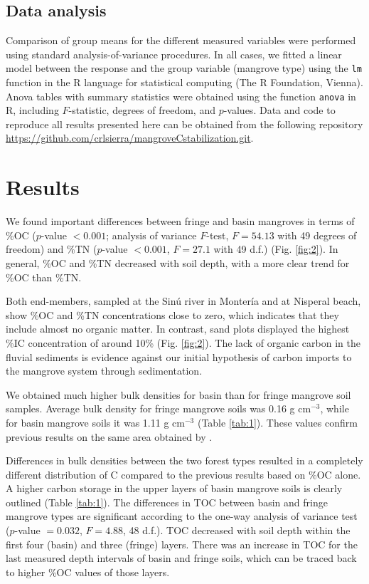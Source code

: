 \subsection{Data analysis}
Comparison of group means for the different measured variables were performed using standard analysis-of-variance procedures. In all cases, we fitted a linear model between the response and the group variable (mangrove type) using the {\tt lm} function in the R language for statistical computing (The R Foundation, Vienna). Anova tables with summary statistics were obtained using the function {\tt anova} in R, including $F$-statistic, degrees of freedom, and $p$-values. Data and code to reproduce all results presented here can be obtained from the following repository \url{https://github.com/crlsierra/mangroveCstabilization.git}. 

\section{Results}

We found important differences between fringe and basin mangroves in terms of \%OC ($p$-value $< 0.001$; analysis of variance $F$-test, $F = 54.13$ with 49 degrees of freedom) and \%TN ($p$-value $< 0.001$, $F = 27.1$ with 49 d.f.) (Fig. \ref{fig:2}). In general, \%OC and \%TN decreased with soil depth, with a more clear trend for \%OC than \%TN. 

Both end-members, sampled at the Sin\'{u} river in Monter\'{i}a and at Nisperal beach, show \%OC and \%TN concentrations close to zero, which indicates that they include almost no organic matter. In contrast, sand plots displayed the highest \%IC concentration of around 10\% (Fig. \ref{fig:2}). The lack of organic carbon in the fluvial sediments is evidence against our initial hypothesis of carbon imports to the mangrove system through sedimentation. 

We obtained much higher bulk densities for basin than for fringe mangrove soil samples. Average bulk density for fringe mangrove soils was 0.16 g cm$^{-3}$, while for basin mangrove soils it was 1.11 g cm$^{-3}$ (Table \ref{tab:1}). These values confirm previous results on the same area obtained by \citet{Bolivar2015}.

Differences in bulk densities between the two forest types resulted in a completely different distribution of C compared to the previous results based on \%OC alone. A higher carbon storage in the upper layers of basin mangrove soils is clearly outlined (Table \ref{tab:1}). The differences in TOC between basin and fringe mangrove types are significant according to the one-way analysis of variance test ($p$-value $= 0.032$, $F = 4.88$, 48 d.f.). TOC decreased with soil depth within the first four (basin) and three (fringe) layers. There was an increase in TOC for the last measured depth intervals of basin and fringe soils, which can be traced back to higher \%OC values of those layers.

